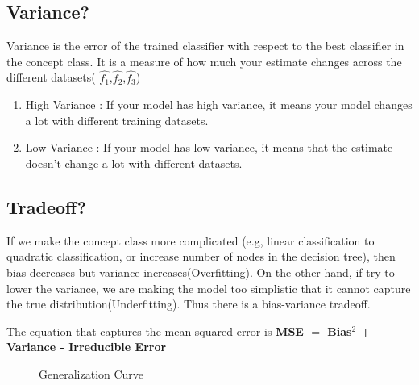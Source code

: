 \subsection {Variance?}
Variance is the error of the trained classifier with respect to the best classifier in the concept class. It is a measure of how much your estimate changes across the different datasets( $\hat{f_1}$,$\hat{f_2}$,$\hat{f_3}$)
\begin{enumerate}
\item High Variance : If your model has high variance, it means your model changes a lot with different training datasets. 
\item Low Variance : If your model has low variance, it means that the estimate doesn't change a lot with different datasets.
\end{enumerate}
\subsection {Tradeoff?}
If we make the concept class more complicated (e.g, linear classification to quadratic classification, or increase number of nodes in the decision tree), then bias decreases but variance increases(Overfitting). On the other hand, if try to lower the variance, we are making the model too simplistic that it cannot capture the true distribution(Underfitting). 
Thus there is a bias-variance tradeoff.

The equation that captures the mean squared error is 
\textbf{MSE $=$ Bias$^2$ + Variance  - Irreducible Error}
 \begin{figure}[h]
\centering
\caption{Generalization Curve}
{\setlength{\fboxsep}{20pt}
\setlength{\fboxrule}{1pt}
\textcolor{cyan}{}
}
\end{figure} 
 
